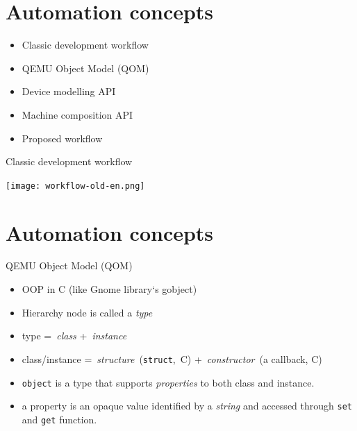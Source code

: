 \documentclass[unicode,hyperref={unicode=true},aspectratio=169]{beamer}
\newcommand*{\sectionpagekb}{\usebeamertemplate*{section page kb}}
\begin{document}
\section{Automation concepts}
\begin{frame}
\sectionpagekb
\begin{itemize}
\item Classic development workflow
\item QEMU Object Model (QOM)
\item Device modelling API
\item Machine composition API
\item Proposed workflow
\end{itemize}
\end{frame}



\begin{frame}{Classic development workflow}
\begin{center}
\texttt{[image: workflow-old-en.png]}
\end{center}
\end{frame}



\section{Automation concepts}
\begin{frame}{QEMU Object Model (QOM)}
\begin{minipage}{0.49\textwidth}
\hfill
\end{minipage}
\hfill
\begin{minipage}{0.49\textwidth}
\begin{itemize}
\item OOP in C (like Gnome library`s gobject)
\item Hierarchy node is called a \textit{type}
\item type =~\textit{class} +~\textit{instance}
\item class/instance =~\textit{structure}~(\texttt{struct},~C)
+~\textit{constructor}~(a callback, C)
\item \texttt{object} is a type that supports \textit{properties} to
both class and instance.
\item a property is an opaque value identified by a \textit{string} and
accessed through \texttt{set} and \texttt{get} function.
\end{itemize}
\end{minipage}
\end{frame}
\end{document}
